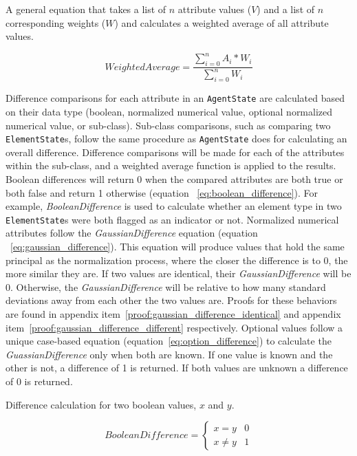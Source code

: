 \caption{A general equation that takes a list of $n$ attribute values ($V$) and a list of $n$ corresponding weights ($W$) and calculates a weighted average of all attribute values.}
\begin{equation} \label{eq:weighted_average}
  WeightedAverage = \frac{\sum_{i=0}^{n} A_{i} * W_{i}}{\sum_{i=0}^{n} W_{i}}
\end{equation}

Difference comparisons for each attribute in an \texttt{AgentState} are calculated based on their data type (boolean, normalized numerical value, optional normalized numerical value, or sub-class).
Sub-class comparisons, such as comparing two \texttt{ElementState}s, follow the same procedure as \texttt{AgentState} does for calculating an overall difference.
Difference comparisons will be made for each of the attributes within the sub-class, and a weighted average function is applied to the results.
Boolean differences will return 0 when the compared attributes are both true or both false and return 1 otherwise (equation ~\ref{eq:boolean_difference}).
For example, \textit{BooleanDifference} is used to calculate whether an element type in two \texttt{ElementState}s were both flagged as an indicator or not.
Normalized numerical attributes follow the \textit{GaussianDifference} equation (equation ~\ref{eq:gaussian_difference}).
This equation will produce values that hold the same principal as the normalization process, where the closer the difference is to 0, the more similar they are.
If two values are identical, their \textit{GaussianDifference} will be 0.
Otherwise, the \textit{GaussianDifference} will be relative to how many standard deviations away from each other the two values are.
Proofs for these behaviors are found in appendix item~\ref{proof:gaussian_difference_identical} and appendix item~\ref{proof:gaussian_difference_different} respectively.
Optional values follow a unique case-based equation (equation~\ref{eq:option_difference}) to calculate the \textit{GuassianDifference} only when both are known.
If one value is known and the other is not, a difference of 1 is returned.
If both values are unknown a difference of 0 is returned.

\caption{Difference calculation for two boolean values, $x$ and $y$.}
\begin{equation} \label{eq:boolean_difference}
  BooleanDifference = \begin{cases}
  x = y & 0 \\
  x \neq y & 1
\end{cases}
\end{equation}

